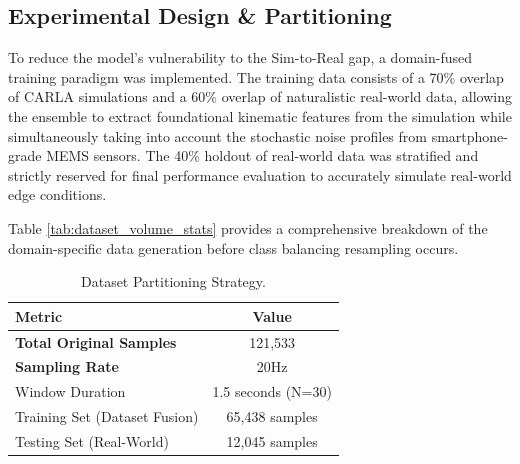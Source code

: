 \documentclass[pdflatex,sn-mathphys-num]{sn-jnl}
\theoremstyle{thmstyleone}
\theoremstyle{thmstyletwo}
\theoremstyle{thmstylethree}
\begin{document}
\begin{table}[!ht]
\caption{Domain-Specific Data Volume \& Balancing Report (Before Resampling).}
\label{tab:dataset_volume_stats}
\centering
{}
\end{table}

\FloatBarrier
\subsection{Experimental Design \& Partitioning}\label{sec:experimental_design}
To reduce the model's vulnerability to the Sim-to-Real gap, a domain-fused training paradigm was implemented. The training data consists of a 70\% overlap of CARLA simulations and a 60\% overlap of naturalistic real-world data, allowing the ensemble to extract foundational kinematic features from the simulation while simultaneously taking into account the stochastic noise profiles from smartphone-grade MEMS sensors. The 40\% holdout of real-world data was stratified and strictly reserved for final performance evaluation to accurately simulate real-world edge conditions.

Table \ref{tab:dataset_volume_stats} provides a comprehensive breakdown of the domain-specific data generation before class balancing resampling occurs.



\begin{table}[!ht]
\caption{Dataset Partitioning Strategy.}
\label{tab:dataset_stats}
\centering
\begin{tabular*}{\textwidth}{@{\extracolsep{\fill}}lc} \toprule 
\textbf{Metric} & \textbf{Value} \\ \midrule
\textbf{Total Original Samples} & 121,533 \\ 
\textbf{Sampling Rate} & 20Hz \\
Window Duration & 1.5 seconds (N=30) \\
Training Set (Dataset Fusion) & 65,438 samples \\ 
Testing Set (Real-World) & 12,045 samples \\ \bottomrule
\end{tabular*}
\end{table}
\end{document}
